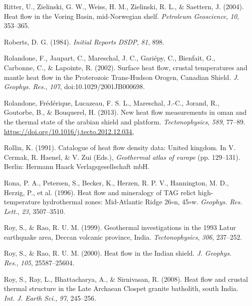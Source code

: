 \documentclass[draft,linenumbers]{agujournal2018}
\begin{document}
\leavevmode{}%
Ritter, U., Zielinski, G. W., Weiss, H. M., Zielinski, R. L., \&
Saettern, J. (2004). Heat flow in the {V{o}ring Basin, mid-Norwegian
shelf}. \emph{Petroleum Geoscience}, \emph{10}, 353--365.

\leavevmode{}%
Roberts, D. G. (1984). \emph{Initial Reports DSDP}, \emph{81}, 898.

\leavevmode{}%
Rolandone, F., Jaupart, C., Mareschal, J. C., Gariépy, C., Bienfait, G.,
Carbonne, C., \& Lapointe, R. (2002). Surface heat flow, crustal
temperatures and mantle heat flow in the {Proterozoic Trans-Hudson
Orogen, Canadian Shield}. \emph{J. Geophys. Res.}, \emph{107},
doi:10.1029/2001JB000698.

\leavevmode{}%
Rolandone, Frédérique, Lucazeau, F. S. L., Mareschal, J.-C., Jorand, R.,
Goutorbe, B., \& Bouquerel, H. (2013). New heat flow measurements in
oman and the thermal state of the arabian shield and platform.
\emph{Tectonophysics}, \emph{589}, 77--89.
\url{https://doi.org/10.1016/j.tecto.2012.12.034,}

\leavevmode{}%
Rollin, K. (1991). Catalogue of heat flow density data: United kingdom.
In V. Cermak, R. Haenel, \& V. Zui (Eds.), \emph{Geothermal atlas of
europe} (pp. 129--131). Berlin: Hermann Haack Verlagsgesellschaft mbH.

\leavevmode{}%
Rona, P. A., Petersen, S., Becker, K., Herzen, R. P. V., Hannington, M.
D., Herzig, P., et al. (1996). Heat flow and mineralogy of TAG relict
high-temperature hydrothermal zones: {Mid-Atlantic Ridge} 26\(\circ\)n,
45\(\circ\)w. \emph{Geophys. Res. Lett.}, \emph{23}, 3507--3510.

\leavevmode{}%
Roy, S., \& Rao, R. U. M. (1999). Geothermal investigations in the 1993
{Latur} earthquake area, {Deccan} volcanic province, {India}.
\emph{Tectonophysics}, \emph{306}, 237--252.

\leavevmode{}%
Roy, S., \& Rao, R. U. M. (2000). Heat flow in the {Indian} shield.
\emph{J. Geophys. Res.}, \emph{105}, 25587--25604.

\leavevmode{}%
Roy, S., Ray, L., Bhattacharya, A., \& Sirnivasan, R. (2008). Heat flow
and crustal thermal structure in the {Late Archaean Clospet granite
batholith, south India}. \emph{Int. J. Earth Sci.}, \emph{97}, 245--256.
\end{document}

